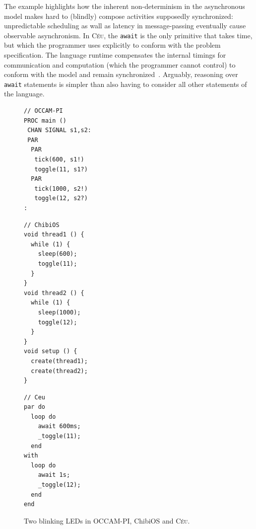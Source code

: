 \documentclass{acm_proc_article-sp}
\newcommand{\CEU}{\textsc{C\'{e}u}\xspace}
\newcommand{\code}[1] {{\small{\texttt{#1}}}}
\newcommand{\1}{\;}
\newcommand{\2}{\;\;}
\newcommand{\3}{\;\;\;}
\newcommand{\5}{\;\;\;\;\;}
\begin{document}
The example highlights how the inherent non-determinism in the asynchronous 
model makes hard to (blindly) compose activities supposedly synchronized: 
unpredictable scheduling as wall as latency in message-passing eventually cause 
observable asynchronism.
%
In \CEU, the \code{await} is the only primitive that takes time, but which the 
programmer uses explicitly to conform with the problem specification.
The language runtime compensates the internal timings for communication and 
computation (which the programmer cannot control) to conform with the model and 
remain synchronized~\cite{ceu.sensys13}.
%
Arguably, reasoning over \code{await} statements is simpler than also having to 
consider all other statements of the language.

\begin{figure}[t]
\begin{minipage}[t]{0.34\linewidth}
\begin{lstlisting}
// OCCAM-PI
PROC main ()
 CHAN SIGNAL s1,s2:
 PAR
  PAR
   tick(600, s1!)
   toggle(11, s1?)
  PAR
   tick(1000, s2!)
   toggle(12, s2?)
:

\end{lstlisting}
\end{minipage}
%
\begin{minipage}[t]{0.33\linewidth}
\begin{lstlisting}
// ChibiOS
void thread1 () {
  while (1) {
    sleep(600);
    toggle(11);
  }
}
void thread2 () {
  while (1) {
    sleep(1000);
    toggle(12);
  }
}
void setup () {
  create(thread1);
  create(thread2);
}

\end{lstlisting}
\end{minipage}
%
\begin{minipage}[t]{0.31\linewidth}
\begin{lstlisting}
// Ceu
par do
  loop do
    await 600ms;
    _toggle(11);
  end
with
  loop do
    await 1s;
    _toggle(12);
  end
end
\end{lstlisting}
\end{minipage}
%
\caption{ Two blinking LEDs in OCCAM-PI, ChibiOS and \CEU.\newline
{\small %
}%
\label{lst.leds}
}
\end{figure}

\end{document}
